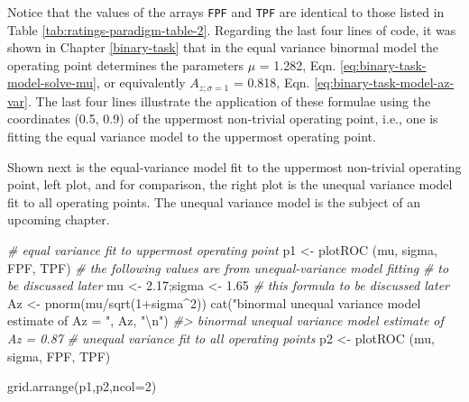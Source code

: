 \documentclass[
]{book}
\newenvironment{Shaded}{\begin{snugshade}}{\end{snugshade}}
\newcommand{\AttributeTok}[1]{\textcolor[rgb]{0.77,0.63,0.00}{#1}}
\newcommand{\CommentTok}[1]{\textcolor[rgb]{0.56,0.35,0.01}{\textit{#1}}}
\newcommand{\DecValTok}[1]{\textcolor[rgb]{0.00,0.00,0.81}{#1}}
\newcommand{\FloatTok}[1]{\textcolor[rgb]{0.00,0.00,0.81}{#1}}
\newcommand{\FunctionTok}[1]{\textcolor[rgb]{0.00,0.00,0.00}{#1}}
\newcommand{\NormalTok}[1]{#1}
\newcommand{\OtherTok}[1]{\textcolor[rgb]{0.56,0.35,0.01}{#1}}
\newcommand{\SpecialCharTok}[1]{\textcolor[rgb]{0.00,0.00,0.00}{#1}}
\newcommand{\StringTok}[1]{\textcolor[rgb]{0.31,0.60,0.02}{#1}}
\begin{document}
Notice that the values of the arrays \texttt{FPF} and \texttt{TPF} are identical to those listed in Table \ref{tab:ratings-paradigm-table-2}. Regarding the last four lines of code, it was shown in Chapter \ref{binary-task} that in the equal variance binormal model the operating point determines the parameters \(\mu\) = 1.282, Eqn. \eqref{eq:binary-task-model-solve-mu}, or equivalently \(A_{z;\sigma = 1}\) = 0.818, Eqn. \eqref{eq:binary-task-model-az-var}. The last four lines illustrate the application of these formulae using the coordinates (0.5, 0.9) of the uppermost non-trivial operating point, i.e., one is fitting the equal variance model to the uppermost operating point.

Shown next is the equal-variance model fit to the uppermost non-trivial operating point, left plot, and for comparison, the right plot is the unequal variance model fit to all operating points. The unequal variance model is the subject of an upcoming chapter.

\begin{Shaded}
\begin{Highlighting}[]
\CommentTok{\# equal variance fit to uppermost operating point}
\NormalTok{p1 }\OtherTok{\textless{}{-}} \FunctionTok{plotROC}\NormalTok{ (mu, sigma, FPF, TPF)}
\CommentTok{\# the following values are from unequal{-}variance model fitting}
\CommentTok{\# to be discussed later}
\NormalTok{mu }\OtherTok{\textless{}{-}} \FloatTok{2.17}\NormalTok{;sigma }\OtherTok{\textless{}{-}} \FloatTok{1.65}
\CommentTok{\# this formula to be discussed later}
\NormalTok{Az }\OtherTok{\textless{}{-}} \FunctionTok{pnorm}\NormalTok{(mu}\SpecialCharTok{/}\FunctionTok{sqrt}\NormalTok{(}\DecValTok{1}\SpecialCharTok{+}\NormalTok{sigma}\SpecialCharTok{\^{}}\DecValTok{2}\NormalTok{))}
\FunctionTok{cat}\NormalTok{(}\StringTok{"binormal unequal variance model estimate of Az = "}\NormalTok{, Az, }\StringTok{"}\SpecialCharTok{\textbackslash{}n}\StringTok{"}\NormalTok{)}
\CommentTok{\#\textgreater{} binormal unequal variance model estimate of Az =  0.87}
\CommentTok{\# unequal variance fit to all operating points}
\NormalTok{p2 }\OtherTok{\textless{}{-}} \FunctionTok{plotROC}\NormalTok{ (mu, sigma, FPF, TPF)}
\end{Highlighting}
\end{Shaded}

\begin{Shaded}
\begin{Highlighting}[]
\FunctionTok{grid.arrange}\NormalTok{(p1,p2,}\AttributeTok{ncol=}\DecValTok{2}\NormalTok{)}
\end{Highlighting}
\end{Shaded}
\end{document}
